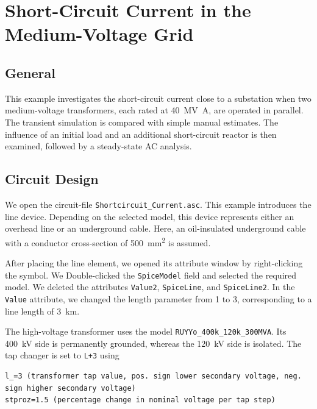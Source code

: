 \chapter{Short-Circuit Current in the Medium-Voltage Grid}
\label{chap:chapter2}

\section{General}
\label{sec:section21}

This example investigates the short-circuit current close to a substation when
two medium-voltage transformers, each rated at \SI{40}{\mega\volt\ampere}, are
operated in parallel. The transient simulation is compared with simple manual
estimates. The influence of an initial load and an additional short-circuit
reactor is then examined, followed by a steady-state AC analysis.

\section{Circuit Design}
\label{sec:section22}

We open the circuit-file \texttt{Shortcircuit\_Current.asc}. This example introduces the line device. Depending on the selected model, this device represents either an overhead line or an underground cable. Here, an oil-insulated underground cable with a conductor cross-section of \SI{500}{\milli\metre\squared} is assumed.

After placing the line element, we opened its attribute window by right-clicking the
symbol. We Double-clicked the \texttt{SpiceModel} field and selected the required
model. We deleted the attributes \texttt{Value2}, \texttt{SpiceLine}, and
\texttt{SpiceLine2}. In the \texttt{Value} attribute, we changed the length
parameter from 1 to 3, corresponding to a line length of \SI{3}{\kilo\metre}.

The high-voltage transformer uses the model
\texttt{RUYYo\_400k\_120k\_300MVA}. Its
\SI{400}{\kilo\volt} side is permanently grounded, whereas the
\SI{120}{\kilo\volt} side is isolated. The tap changer is set to \texttt{L+3}
using

\begin{lstlisting}[style=LTspice]
l_=3 (transformer tap value, pos. sign lower secondary voltage, neg. sign higher secondary voltage)
stproz=1.5 (percentage change in nominal voltage per tap step)
\end{lstlisting}

